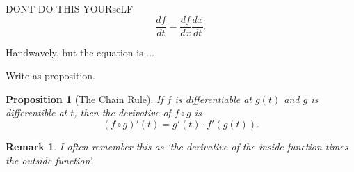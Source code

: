 \documentclass[12pt]{article}
\newcommand{\diff}[2]{\frac{d #1}{d #2} }
\newtheorem{prop}[thm]{Proposition}
\theoremstyle{definition}
\theoremstyle{plain}
\newtheorem{rem}[thm]{Remark}
\numberwithin{equation}{section}
\begin{document}
DONT DO THIS YOURseLF
\[
\diff{f}{t} = \diff{f}{x} \diff{x}{t}.
\]

Handwavely, but the equation is ...

Write as proposition.

\begin{prop}[The Chain Rule]
If $f$ is differentiable at $g(t)$ and $g$ is differentible at $t$, then the derivative of $f\circ g$ is
\[
(f\circ g)'(t) = g'(t)\cdot f'(g(t)).
\]
\end{prop}
\begin{rem}
I often remember this as `the derivative of the inside function times the outside function'.
\end{rem}

\end{document}
